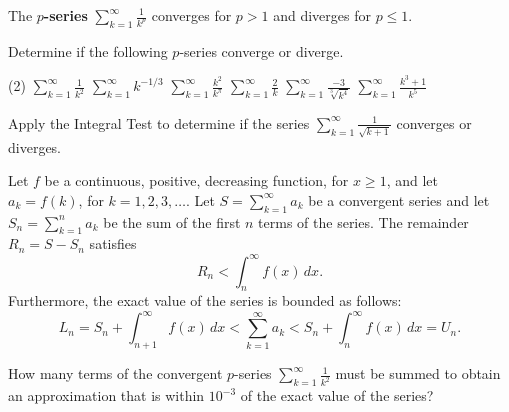 \documentclass[../mathNotesPreamble]{subfiles}
\begin{document}
  \begin{thmBox*}
    The \textbf{$p$-series} $\displaystyle\sum_{k=1}^\infty \frac{1}{k^p}$ converges for $p>1$ and diverges for $p\leq 1$.
  \end{thmBox*}
  \begin{ex*}
    Determine if the following $p$-series converge or diverge.
  \end{ex*}
  \begin{tasks}[after-item-skip=\stretch{1}, label=,item-indent=0pt](2)
    \task $\displaystyle \sum_{k=1}^\infty \frac{1}{k^2}$
    \task $\displaystyle \sum_{k=1}^\infty k^{-1/3}$
    \task $\displaystyle \sum_{k=1}^\infty \frac{k^2}{k^\pi}$
    \task $\displaystyle \sum_{k=1}^\infty \frac{2}{k}$
    \task $\displaystyle \sum_{k=1}^\infty \frac{-3}{\sqrt[3]{k^4}}$
    \task $\displaystyle \sum_{k=1}^\infty \frac{k^3+1}{k^5}$
  \end{tasks}
  \pagebreak

  \begin{ex*}
    Apply the Integral Test to determine if the series $\displaystyle\sum_{k=1}^\infty \frac{1}{\sqrt{k+1}}$ converges or diverges.
  \end{ex*}
  \pagebreak

  \begin{thmBox*}
    Let $f$ be a continuous, positive, decreasing function, for $x\geq 1$, and let $a_k=f(k)$, for $k=1,2,3,\dots$. Let $S=\displaystyle\sum_{k=1}^\infty a_k$ be a convergent series and let $S_n=\displaystyle\sum_{k=1}^n a_k$ be the sum of the first $n$ terms of the series. The remainder $R_n=S-S_n$ satisfies 
      \[R_n < \int_n^\infty f(x)\,dx.\]
    Furthermore, the exact value of the series is bounded as follows:
      \[L_n=S_n+\int_{n+1}^\infty f(x)\,dx < \sum_{k=1}^\infty a_k < S_n+\int_n^\infty f(x)\,dx=U_n.\]
  \end{thmBox*}
  \begin{ex*}
    How many terms of the convergent $p$-series $\displaystyle\sum_{k=1}^\infty \frac{1}{k^2}$ must be summed to obtain an approximation that is within $10^{-3}$ of the exact value of the series?
  \end{ex*}

  \pagebreak
\end{document}

